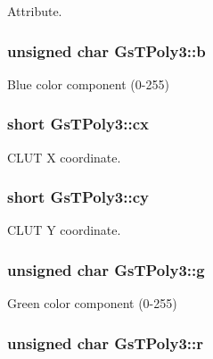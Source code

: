Attribute. 

\hypertarget{structGsTPoly3_a889229e60bd4bfed549ee3fc5e9346da}{}
\subsubsection[{b}]{\setlength{\rightskip}{0pt plus 5cm}unsigned char Gs\+T\+Poly3\+::b}\label{structGsTPoly3_a889229e60bd4bfed549ee3fc5e9346da}


Blue color component (0-\/255) 

\hypertarget{structGsTPoly3_a43b86f46391cd471dc92a9dec1a3b46f}{}
\subsubsection[{cx}]{\setlength{\rightskip}{0pt plus 5cm}short Gs\+T\+Poly3\+::cx}\label{structGsTPoly3_a43b86f46391cd471dc92a9dec1a3b46f}


C\+L\+U\+T X coordinate. 

\hypertarget{structGsTPoly3_a825c6c03d56ff019f7845f06222d096a}{}
\subsubsection[{cy}]{\setlength{\rightskip}{0pt plus 5cm}short Gs\+T\+Poly3\+::cy}\label{structGsTPoly3_a825c6c03d56ff019f7845f06222d096a}


C\+L\+U\+T Y coordinate. 

\hypertarget{structGsTPoly3_a4bef416306bb3d0710b26fefc75a3e6e}{}
\subsubsection[{g}]{\setlength{\rightskip}{0pt plus 5cm}unsigned char Gs\+T\+Poly3\+::g}\label{structGsTPoly3_a4bef416306bb3d0710b26fefc75a3e6e}


Green color component (0-\/255) 

\hypertarget{structGsTPoly3_a377534efc910699a7515c773ce93ba3e}{}
\subsubsection[{r}]{\setlength{\rightskip}{0pt plus 5cm}unsigned char Gs\+T\+Poly3\+::r}\label{structGsTPoly3_a377534efc910699a7515c773ce93ba3e}


